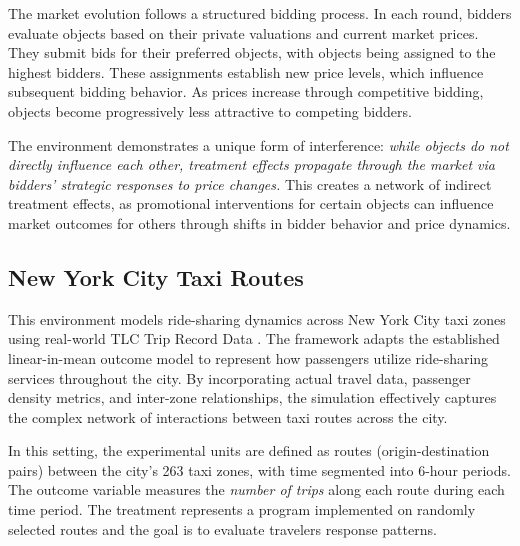 The market evolution follows a structured bidding process. In each round, bidders evaluate objects based on their private valuations and current market prices. They submit bids for their preferred objects, with objects being assigned to the highest bidders. These assignments establish new price levels, which influence subsequent bidding behavior. As prices increase through competitive bidding, objects become progressively less attractive to competing bidders.

The environment demonstrates a unique form of interference: \emph{while objects do not directly influence each other, treatment effects propagate through the market via bidders' strategic responses to price changes.} This creates a network of indirect treatment effects, as promotional interventions for certain objects can influence market outcomes for others through shifts in bidder behavior and price dynamics.


\subsection{New York City Taxi Routes}
\label{sec:LiM}
% 
This environment models ride-sharing dynamics across New York City taxi zones using real-world TLC Trip Record Data \citep{nyc_tlc_trip_data}. The framework adapts the established linear-in-mean outcome model \citep{eckles2016design,cai2015social,leung2022causal} to represent how passengers utilize ride-sharing services throughout the city. By incorporating actual travel data, passenger density metrics, and inter-zone relationships, the simulation effectively captures the complex network of interactions between taxi routes across the city.

In this setting, the experimental units are defined as routes (origin-destination pairs) between the city's 263 taxi zones, with time segmented into 6-hour periods. The outcome variable measures the \emph{number of trips} along each route during each time period. The treatment represents a program implemented on randomly selected routes and the goal is to evaluate travelers response patterns.

